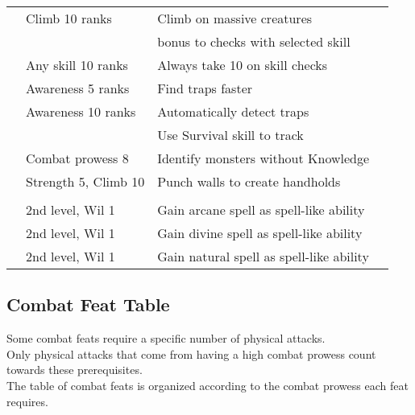 \begin{longtabuwrapper}
\begin{longtabu}{>{\lcol}p{10em} >{\lcol}p{15em} >{\lcol}X >{\lcol}p{3em}}
         & Climb 10 ranks & Climb on massive creatures &  \\
         & \x &   bonus to checks with selected skill &  \\
         & Any skill 10 ranks & Always take 10 on skill checks &  \\
         & Awareness 5 ranks & Find traps faster &  \\
         & Awareness 10 ranks & Automatically detect traps &  \\
         & \x &  Use Survival skill to track &  \\
         & Combat prowess 8 & Identify monsters without Knowledge &  \\
         & Strength 5, Climb 10 & Punch walls to create handholds &  \\

        \midrule
         &  &  &  \\
         & 2nd level, Wil 1 & Gain arcane spell as spell-like ability &  \\
         & 2nd level, Wil 1 & Gain divine spell as spell-like ability &  \\
         & 2nd level, Wil 1 & Gain natural spell as spell-like ability &  \\

    \end{longtabu}
\end{longtabuwrapper}

\subsection{Combat Feat Table}\label{cap:Combat Feats}

Some combat feats require a specific number of physical attacks.\\
Only physical attacks that come from having a high combat prowess count towards these prerequisites.\\
The table of combat feats is organized according to the combat prowess each feat requires.\\

